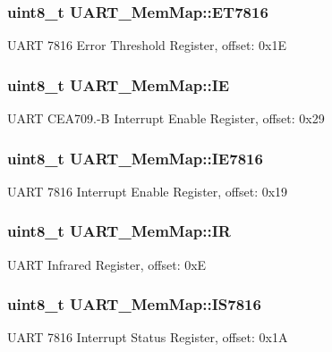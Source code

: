 \subsubsection[{E\+T7816}]{\setlength{\rightskip}{0pt plus 5cm}uint8\+\_\+t U\+A\+R\+T\+\_\+\+Mem\+Map\+::\+E\+T7816}\label{struct_u_a_r_t___mem_map_a97cac628a8a40a8369eb7339bd12cb3f}
U\+A\+R\+T 7816 Error Threshold Register, offset\+: 0x1\+E \hypertarget{struct_u_a_r_t___mem_map_a2afbf716d5118bddf32eb285fbb15460}{}
\subsubsection[{I\+E}]{\setlength{\rightskip}{0pt plus 5cm}uint8\+\_\+t U\+A\+R\+T\+\_\+\+Mem\+Map\+::\+I\+E}\label{struct_u_a_r_t___mem_map_a2afbf716d5118bddf32eb285fbb15460}
U\+A\+R\+T C\+E\+A709.-\/\+B Interrupt Enable Register, offset\+: 0x29 \hypertarget{struct_u_a_r_t___mem_map_ac017c0660f75109edd9cc250a1ddfb5a}{}
\subsubsection[{I\+E7816}]{\setlength{\rightskip}{0pt plus 5cm}uint8\+\_\+t U\+A\+R\+T\+\_\+\+Mem\+Map\+::\+I\+E7816}\label{struct_u_a_r_t___mem_map_ac017c0660f75109edd9cc250a1ddfb5a}
U\+A\+R\+T 7816 Interrupt Enable Register, offset\+: 0x19 \hypertarget{struct_u_a_r_t___mem_map_a8d1433df262b6816268f338d0c8e7d57}{}
\subsubsection[{I\+R}]{\setlength{\rightskip}{0pt plus 5cm}uint8\+\_\+t U\+A\+R\+T\+\_\+\+Mem\+Map\+::\+I\+R}\label{struct_u_a_r_t___mem_map_a8d1433df262b6816268f338d0c8e7d57}
U\+A\+R\+T Infrared Register, offset\+: 0x\+E \hypertarget{struct_u_a_r_t___mem_map_a322fd75b8e5c882ec48c6e065aade707}{}
\subsubsection[{I\+S7816}]{\setlength{\rightskip}{0pt plus 5cm}uint8\+\_\+t U\+A\+R\+T\+\_\+\+Mem\+Map\+::\+I\+S7816}\label{struct_u_a_r_t___mem_map_a322fd75b8e5c882ec48c6e065aade707}
U\+A\+R\+T 7816 Interrupt Status Register, offset\+: 0x1\+A \hypertarget{struct_u_a_r_t___mem_map_a0150c1ad073843276caf61c950794c17}{}

